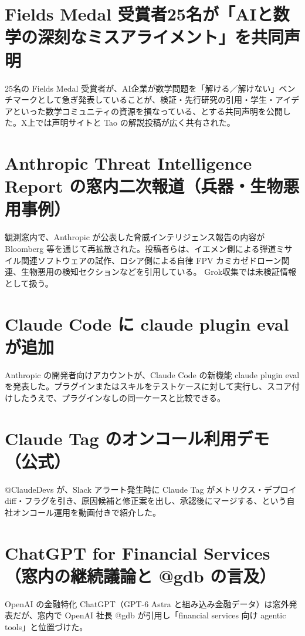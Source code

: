 \section{Fields Medal 受賞者25名が「AIと数学の深刻なミスアライメント」を共同声明}
25名の Fields Medal 受賞者が、AI企業が数学問題を「解ける／解けない」ベンチマークとして急ぎ発表していることが、検証・先行研究の引用・学生・アイデアといった数学コミュニティの資源を損なっている、とする共同声明を公開した。X上では声明サイトと Tao の解説投稿が広く共有された。

\section{Anthropic Threat Intelligence Report の窓内二次報道（兵器・生物悪用事例）}
観測窓内で、Anthropic が公表した脅威インテリジェンス報告の内容が Bloomberg 等を通じて再拡散された。投稿者らは、イエメン側による弾道ミサイル関連ソフトウェアの試作、ロシア側による自律 FPV カミカゼドローン関連、生物悪用の検知セクションなどを引用している。 Grok収集では未検証情報として扱う。

\section{Claude Code に claude plugin eval が追加}
Anthropic の開発者向けアカウントが、Claude Code の新機能 claude plugin eval を発表した。プラグインまたはスキルをテストケースに対して実行し、スコア付けしたうえで、プラグインなしの同一ケースと比較できる。

\section{Claude Tag のオンコール利用デモ（公式）}
@ClaudeDevs が、Slack アラート発生時に Claude Tag がメトリクス・デプロイ diff・フラグを引き、原因候補と修正案を出し、承認後にマージする、という自社オンコール運用を動画付きで紹介した。

\section{ChatGPT for Financial Services（窓内の継続議論と @gdb の言及）}
OpenAI の金融特化 ChatGPT（GPT-6 Astra と組み込み金融データ）は窓外発表だが、窓内で OpenAI 社長 @gdb が引用し「financial services 向け agentic tools」と位置づけた。

